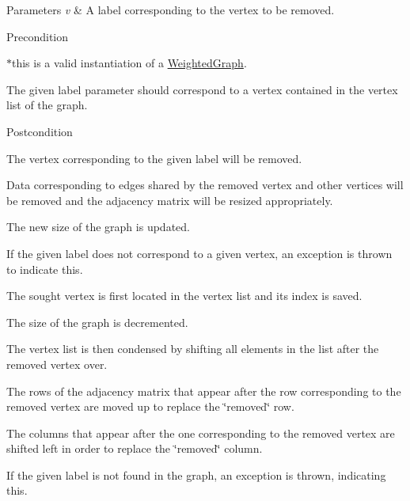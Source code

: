 \begin{DoxyParams}{\-Parameters}
{\em v} & \-A label corresponding to the vertex to be removed.\\
\hline
\end{DoxyParams}
\begin{DoxyPrecond}{\-Precondition}

\begin{DoxyEnumerate}
\item $\ast$this is a valid instantiation of a \hyperlink{class_weighted_graph}{\-Weighted\-Graph}.
\item \-The given label parameter should correspond to a vertex contained in the vertex list of the graph.
\end{DoxyEnumerate}
\end{DoxyPrecond}
\begin{DoxyPostcond}{\-Postcondition}

\begin{DoxyEnumerate}
\item \-The vertex corresponding to the given label will be removed.
\item \-Data corresponding to edges shared by the removed vertex and other vertices will be removed and the adjacency matrix will be resized appropriately.
\item \-The new size of the graph is updated.
\item \-If the given label does not correspond to a given vertex, an exception is thrown to indicate this.
\end{DoxyEnumerate}
\end{DoxyPostcond}

\begin{DoxyEnumerate}
\item \-The sought vertex is first located in the vertex list and its index is saved.
\item \-The size of the graph is decremented.
\item \-The vertex list is then condensed by shifting all elements in the list after the removed vertex over.
\item \-The rows of the adjacency matrix that appear after the row corresponding to the removed vertex are moved up to replace the \char`\"{}removed\char`\"{} row.
\item \-The columns that appear after the one corresponding to the removed vertex are shifted left in order to replace the \char`\"{}removed\char`\"{} column.
\item \-If the given label is not found in the graph, an exception is thrown, indicating this.
\end{DoxyEnumerate}


